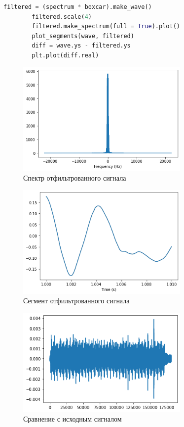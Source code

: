 \documentclass[a4paper, 12pt]{report}
\begin{document}
	\begin{lstlisting}[language=Python,caption=Применим прямоугольный фильтр и результат сравним с исходным сигналом]
		filtered = (spectrum * boxcar).make_wave()
		filtered.scale(4)
		filtered.make_spectrum(full = True).plot()
		plot_segments(wave, filtered)
		diff = wave.ys - filtered.ys
		plt.plot(diff.real)
	\end{lstlisting}
	\begin{figure}[H]
		\centering
		\includegraphics[width=0.75\textwidth]{samp12.png}
		\caption{Спектр отфильтрованного сигнала}
		\label{fig:samp12}
	\end{figure}
	\begin{figure}[H]
		\centering
		\includegraphics[width=0.75\textwidth]{samp13.png}
		\caption{Сегмент отфильтрованного сигнала}
		\label{fig:samp13}
	\end{figure}
	\begin{figure}[H]
		\centering
		\includegraphics[width=0.75\textwidth]{samp14.png}
		\caption{Сравнение с исходным сигналом}
		\label{fig:samp14}
	\end{figure}
\end{document}

